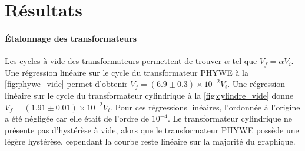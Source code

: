 \section{Résultats}

\paragraph{Étalonnage des transformateurs}
Les cycles à vide des transformateurs permettent de trouver \(\alpha\) tel que \(V_f = \alpha V_i\). Une régression linéaire sur le cycle du transformateur PHYWE à la \autoref{fig:phywe_vide} permet d'obtenir \mbox{\(V_f = (6.9 \pm 0.3)\times 10^{-2} V_i\)}. Une régression linéaire sur le cycle du transformateur cylindrique à la \autoref{fig:cylindre_vide} donne \mbox{\(V_f = (1.91 \pm 0.01)\times 10^{-2} V_i\)}. Pour ces régressions linéaires, l'ordonnée à l'origine a été négligée car elle était de l'ordre de \(10^{-4}\). Le transformateur cylindrique ne présente pas d'hystérèse à vide, alors que le transformateur PHYWE possède une légère hystérèse, cependant la courbe reste linéaire sur la majorité du graphique.

